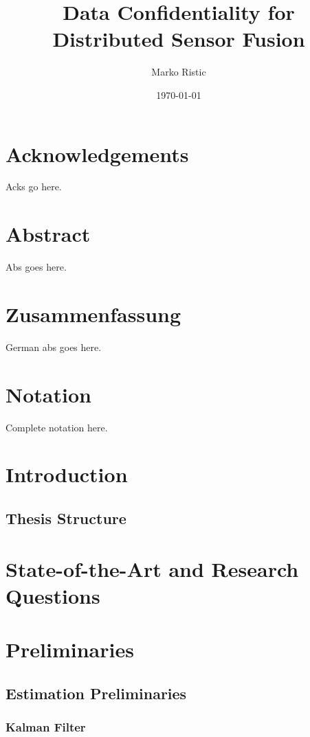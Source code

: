 \documentclass[oneside]{scrbook}
\title{Data Confidentiality for Distributed Sensor Fusion}
\author{Marko Ristic}
\date{\today}
\begin{document}
\maketitle

\frontmatter
\tableofcontents
\listoffigures
\listoftables

\chapter{Acknowledgements}

Acks go here.

\chapter{Abstract}

Abs goes here.

\chapter{Zusammenfassung}

German abs goes here.

\chapter{Notation}

Complete notation here.

\mainmatter

\chapter{Introduction}
\section{Thesis Structure}


\chapter{State-of-the-Art and Research Questions}

\chapter{Preliminaries}
\section{Estimation Preliminaries}
\subsection{Kalman Filter}
\end{document}
